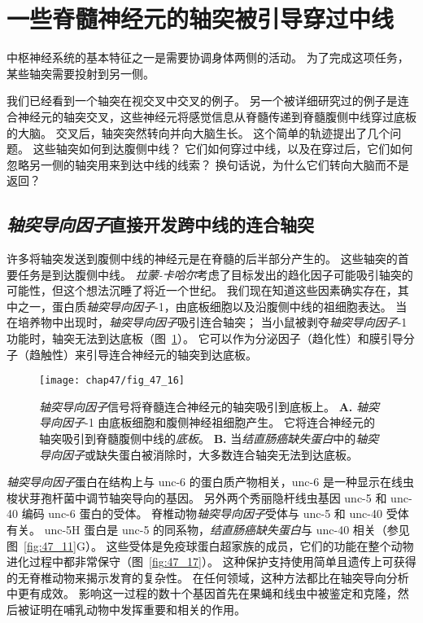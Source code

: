 \section{一些脊髓神经元的轴突被引导穿过中线}

中枢神经系统的基本特征之一是需要协调身体两侧的活动。
为了完成这项任务，某些轴突需要投射到另一侧。


我们已经看到一个轴突在视交叉中交叉的例子。
另一个被详细研究过的例子是连合神经元的轴突交叉，这些神经元将感觉信息从脊髓传递到脊髓腹侧中线穿过底板的大脑。
交叉后，轴突突然转向并向大脑生长。
这个简单的轨迹提出了几个问题。
这些轴突如何到达腹侧中线？
它们如何穿过中线，以及在穿过后，它们如何忽略另一侧的轴突用来到达中线的线索？
换句话说，为什么它们转向大脑而不是返回？



\subsection{\textit{轴突导向因子}直接开发跨中线的连合轴突}

许多将轴突发送到腹侧中线的神经元是在脊髓的后半部分产生的。
这些轴突的首要任务是到达腹侧中线。
\textit{拉蒙-卡哈尔}考虑了目标发出的趋化因子可能吸引轴突的可能性，但这个想法沉睡了将近一个世纪。
我们现在知道这些因素确实存在，其中之一，蛋白质\textit{轴突导向因子}-1，由底板细胞以及沿腹侧中线的祖细胞表达。
当在培养物中出现时，\textit{轴突导向因子}吸引连合轴突；
当小鼠被剥夺\textit{轴突导向因子}-1 功能时，轴突无法到达底板（图~\ref{fig:47_16}）。
它可以作为分泌因子（趋化性）和膜引导分子（趋触性）来引导连合神经元的轴突到达底板。


\begin{figure}[htbp]
	\centering
	\texttt{[image: chap47/fig\_47\_16]}
	\caption{\textit{轴突导向因子}信号将脊髓连合神经元的轴突吸引到底板上。
		\textbf{A.} \textit{轴突导向因子}-1 由底板细胞和腹侧神经祖细胞产生。
		它将连合神经元的轴突吸引到脊髓腹侧中线的\textit{底板}。
		\textbf{B.} 当\textit{结直肠癌缺失蛋白}中的\textit{轴突导向因子}或缺失蛋白被消除时，大多数连合轴突无法到达底板。}
	\label{fig:47_16}
\end{figure}


\textit{轴突导向因子}蛋白在结构上与 unc-6 的蛋白质产物相关，unc-6 是一种显示在线虫梭状芽孢杆菌中调节轴突导向的基因。
另外两个秀丽隐杆线虫基因 unc-5 和 unc-40 编码 unc-6 蛋白的受体。
脊椎动物\textit{轴突导向因子}受体与 unc-5 和 unc-40 受体有关。
unc-5H 蛋白是 unc-5 的同系物，\textit{结直肠癌缺失蛋白}与 unc-40 相关（参见图~\ref{fig:47_11}G）。
这些受体是免疫球蛋白超家族的成员，它们的功能在整个动物进化过程中都非常保守（图~\ref{fig:47_17}）。
这种保护支持使用简单且遗传上可获得的无脊椎动物来揭示发育的复杂性。
在任何领域，这种方法都比在轴突导向分析中更有成效。
影响这一过程的数十个基因首先在果蝇和线虫中被鉴定和克隆，然后被证明在哺乳动物中发挥重要和相关的作用。


